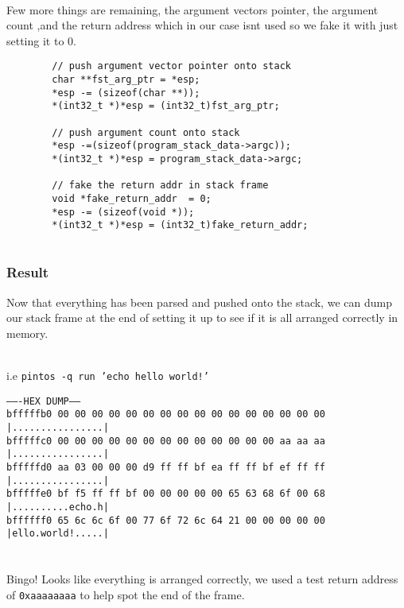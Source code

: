 \documentclass[]{article}
\begin{document}
	\textbf{}\\
	Few more things are remaining, the argument vectors pointer, the argument count ,and the return address which in our case isnt used so we fake it with just setting it to 0.
	
			\lstset{language=C,tabsize=2}
    \begin{lstlisting}
		// push argument vector pointer onto stack
		char **fst_arg_ptr = *esp;
		*esp -= (sizeof(char **));
		*(int32_t *)*esp = (int32_t)fst_arg_ptr;
		 
		// push argument count onto stack
		*esp -=(sizeof(program_stack_data->argc));
		*(int32_t *)*esp = program_stack_data->argc;
		   
		// fake the return addr in stack frame
		void *fake_return_addr  = 0;
		*esp -= (sizeof(void *));
		*(int32_t *)*esp = (int32_t)fake_return_addr;    
    
    \end{lstlisting}
		
	\newpage  
	\subsubsection{Result}
	Now that everything has been parsed and pushed onto the stack, we can dump our stack frame at the end of setting it up to see if it is all arranged correctly in memory.\\
	\texttt{}\\
	\centerline{i.e \texttt{pintos -q run 'echo hello world!'}}
	\texttt{}


\footnotesize{\texttt{-------HEX DUMP------\\
bfffffb0  00 00 00 00 00 00 00 00  00 00 00 00 00 00 00 00  |................|\\
bfffffc0  00 00 00 00 00 00 00 00  00 00 00 00 00 aa aa aa  |................|\\
bfffffd0  aa 03 00 00 00 d9 ff ff  bf ea ff ff bf ef ff ff  |................|\\
bfffffe0  bf f5 ff ff bf 00 00 00  00 00 65 63 68 6f 00 68  |..........echo.h|\\
bffffff0  65 6c 6c 6f 00 77 6f 72  6c 64 21 00 00 00 00 00  |ello.world!.....|}
}	
\\ 
\texttt{}\\
\texttt{}
\normalsize{}
\\
Bingo! Looks like everything is arranged correctly, we used a test return address of \texttt{0xaaaaaaaa} to help spot the end of the frame.
\end{document}
